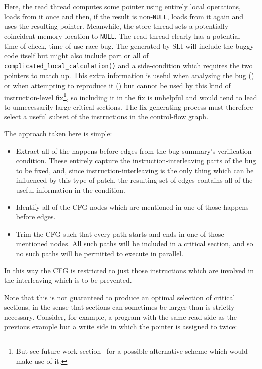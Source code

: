 Here, the read thread computes some pointer using entirely local
operations, loads from it once and then, if the result is
non-\verb|NULL|, loads from it again and uses the resulting pointer.
Meanwhile, the store thread sets a potentially coincident memory
location to \verb|NULL|.  The read thread clearly has a potential
time-of-check, time-of-use race bug.  The \StateMachines generated by
SLI will include the buggy code itself but might also include part or
all of \verb|complicated_local_calculation()| and a side-condition
which requires the two pointers to match up.  This extra information
is useful when analysing the bug (\needCite) or when attempting to
reproduce it (\needCite) but cannot be used by this kind of
instruction-level fix\footnote{But see future work section~\needCite
  for a possible alternative scheme which would make use of it.}, so
including it in the fix is unhelpful and would tend to lead to
unnecessarily large critical sections.  The fix generating process
must therefore select a useful subset of the instructions in the
control-flow graph.

The approach taken here is simple:

\begin{itemize}
\item
  Extract all of the happens-before edges from the bug summary's
  verification condition.  These entirely capture the
  instruction-interleaving parts of the bug to be fixed, and, since
  instruction-interleaving is the only thing which can be influenced
  by this type of patch, the resulting set of edges contains all of
  the useful information in the condition.
\item
  Identify all of the CFG nodes which are mentioned in one of those
  happens-before edges.
\item
  Trim the CFG such that every path starts and ends in one of those
  mentioned nodes.  All such paths will be included in a critical
  section, and so no such paths will be permitted to execute in
  parallel.
\end{itemize}

In this way the CFG is restricted to just those instructions which are
involved in the interleaving which is to be prevented.

Note that this is not guaranteed to produce an optimal selection of
critical sections, in the sense that sections can sometimes be larger
than is strictly necessary.  Consider, for example, a program with the
same read side as the previous example but a write side in which the
pointer is assigned to twice:

